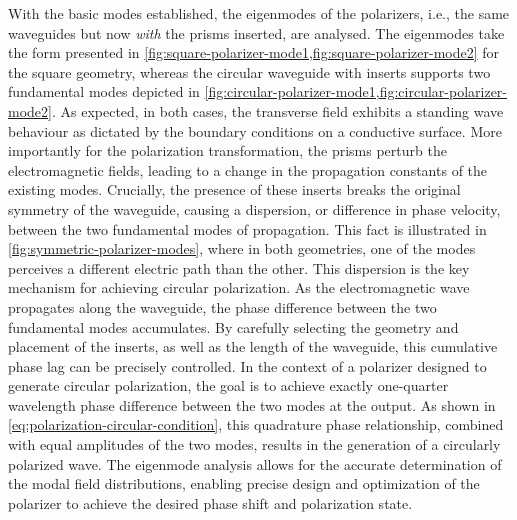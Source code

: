 \documentclass[11pt,a4paper,twoside,openany]{report}
\begin{document}
With the basic modes established, the eigenmodes of the polarizers, i.e., the same waveguides but now \emph{with} the prisms inserted, are analysed. The eigenmodes take the form presented in \cref{fig:square-polarizer-mode1,fig:square-polarizer-mode2} for the square geometry, whereas the circular waveguide with inserts supports two fundamental modes depicted in \cref{fig:circular-polarizer-mode1,fig:circular-polarizer-mode2}. As expected, in both cases, the transverse field exhibits a standing wave behaviour as dictated by the boundary conditions on a conductive surface. More importantly for the polarization transformation, the prisms perturb the electromagnetic fields, leading to a change in the propagation constants of the existing modes. Crucially, the presence of these inserts breaks the original symmetry of the waveguide, causing a dispersion, or difference in phase velocity, between the two fundamental modes of propagation. This fact is illustrated in \cref{fig:symmetric-polarizer-modes}, where in both geometries, one of the modes perceives a different electric path than the other. This dispersion is the key mechanism for achieving circular polarization. As the electromagnetic wave propagates along the waveguide, the phase difference between the two fundamental modes accumulates. By carefully selecting the geometry and placement of the inserts, as well as the length of the waveguide, this cumulative phase lag can be precisely controlled. In the context of a polarizer designed to generate circular polarization, the goal is to achieve exactly one-quarter wavelength phase difference between the two modes at the output. As shown in \cref{eq:polarization-circular-condition}, this quadrature phase relationship, combined with equal amplitudes of the two modes, results in the generation of a circularly polarized wave. The eigenmode analysis allows for the accurate determination of the modal field distributions, enabling precise design and optimization of the polarizer to achieve the desired phase shift and polarization state.
\end{document}
